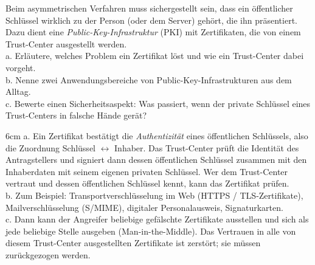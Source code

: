 \question[5]
Beim asymmetrischen Verfahren muss sichergestellt sein, dass ein öffentlicher Schlüssel wirklich zu
der Person (oder dem Server) gehört, die ihn präsentiert. Dazu dient eine
\textit{Public-Key-Infrastruktur} (PKI) mit Zertifikaten, die von einem Trust-Center ausgestellt werden. \\
a. Erläutere, welches Problem ein Zertifikat löst und wie ein Trust-Center dabei vorgeht. \\
b. Nenne zwei Anwendungsbereiche von Public-Key-Infrastrukturen aus dem Alltag. \\
c. Bewerte einen Sicherheitsaspekt: Was passiert, wenn der private Schlüssel eines Trust-Centers
in falsche Hände gerät?

\begin{solutionbox}{6cm}
a. Ein Zertifikat bestätigt die \textit{Authentizität} eines öffentlichen Schlüssels, also die
Zuordnung Schlüssel $\leftrightarrow$ Inhaber. Das Trust-Center prüft die Identität des Antragstellers
und signiert dann dessen öffentlichen Schlüssel zusammen mit den Inhaberdaten mit seinem eigenen
privaten Schlüssel. Wer dem Trust-Center vertraut und dessen öffentlichen Schlüssel kennt, kann
das Zertifikat prüfen. \\
b. Zum Beispiel: Transportverschlüsselung im Web (HTTPS / TLS-Zertifikate), Mailverschlüsselung
(S/MIME), digitaler Personalausweis, Signaturkarten. \\
c. Dann kann der Angreifer beliebige gefälschte Zertifikate ausstellen und sich als jede beliebige
Stelle ausgeben (Man-in-the-Middle). Das Vertrauen in alle von diesem Trust-Center ausgestellten
Zertifikate ist zerstört; sie müssen zurückgezogen werden.
\end{solutionbox}
